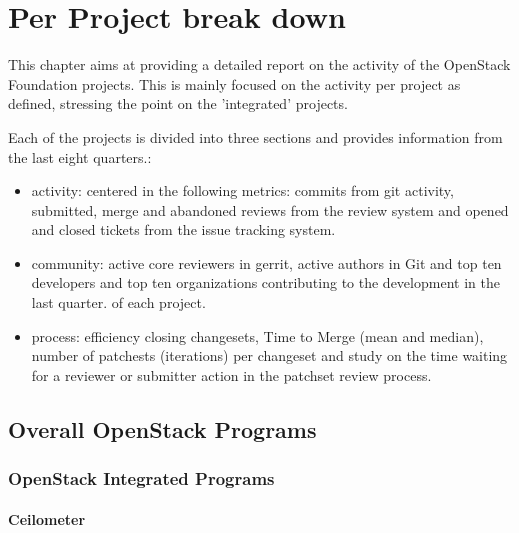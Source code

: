 \documentclass[a4wide,11pt]{report}
\begin{document}



\chapter{Per Project break down}

This chapter aims at providing a detailed report on the activity of the OpenStack Foundation projects.
This is mainly focused on the activity per project as defined, stressing the point on the 'integrated' projects.

Each of the projects is divided into three sections and provides information from the last eight quarters.: 
\begin{itemize}
\item activity: centered in the following metrics: commits from git activity, submitted, merge and abandoned reviews from the review system and
opened and closed tickets from the issue tracking system. 
\item community: active core reviewers in gerrit, active authors in Git and top ten developers and top ten organizations contributing to the development in the last quarter.
of each project.
\item process: efficiency closing changesets, Time to Merge (mean and median), number of patchests (iterations) per changeset and study on the time waiting for a reviewer or submitter action in the patchset review process.
\end{itemize}


\newpage
\section{Overall OpenStack Programs}


\newpage
\subsection{OpenStack Integrated Programs}


\newpage 
\subsubsection{Ceilometer}

\end{document}

